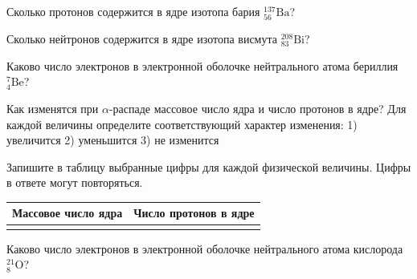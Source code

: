 \begin{taskbasic}[code={\label{task:nuclear_protons_barium}}]
Сколько протонов содержится в ядре изотопа бария $^{137}_{56}\text{Ba}$?

\end{taskbasic}

\begin{taskbasic}[code={\label{task:nuclear_neutrons_bismuth}}]
Сколько нейтронов содержится в ядре изотопа висмута $^{208}_{83}\text{Bi}$?

\end{taskbasic}

\begin{taskbasic}[code={\label{task:atomic_electrons_beryllium}}]
Каково число электронов в электронной оболочке нейтрального атома бериллия $^7_4\text{Be}$?

\end{taskbasic}

\begin{taskbasic}[code={\label{task:nuclear_alpha_mass_protons}}]
Как изменятся при $\alpha$-распаде массовое число ядра и число протонов в ядре? Для каждой величины определите соответствующий характер изменения:
1) увеличится
2) уменьшится
3) не изменится

Запишите в таблицу выбранные цифры для каждой физической величины. Цифры в ответе могут повторяться.

\nopagebreak\smallskip
\begin{center}
\small
\begin{tabular}{|c|c|}
\hline
Массовое число ядра & Число протонов в ядре \\ \hline
 & \\ \hline
\end{tabular}
\end{center}

\end{taskbasic}

\begin{taskbasic}[code={\label{task:atomic_electrons_oxygen}}]
Каково число электронов в электронной оболочке нейтрального атома кислорода $^{21}_8\text{O}$?

\end{taskbasic}

